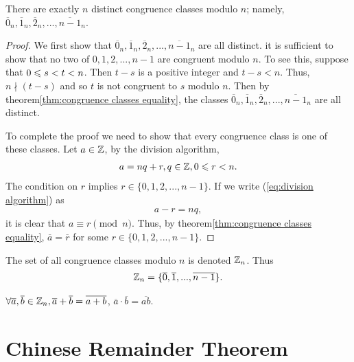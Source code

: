 \begin{corollary}{}{}
    There are exactly $n$ distinct congruence classes modulo $n$; namely, 
    $\overline{0}_n,\overline{1}_n,\overline{2}_n,...,\overline{n-1}_n$.
\end{corollary}
\begin{proof}
    We first show that $\overline{0}_n,\overline{1}_n,\overline{2}_n,...,\overline{n-1}_n$
    are all distinct. it is sufficient to show that  no two of $0, 1, 2, . . . , n-1$ are congruent modulo $n$. 
    To see this, suppose that $0\leqslant s<t<n$. 
    Then $t-s$ is a positive integer and $t-s<n$. Thus, $n\nmid (t-s)$ and so $t$ is not congruent to $s$ modulo $n$. 
    Then by theorem\ref{thm:congruence classes equality}, the classes
    $\overline{0}_n,\overline{1}_n,\overline{2}_n,...,\overline{n-1}_n$ are all distinct. 

    To complete the proof we need to show that every congruence class is one of these classes.
    Let $a\in\mathbb{Z}$, by the division algorithm, 
    \begin{align}
        a=nq+r, q\in\mathbb{Z},0\leqslant r<n.
        \label{eq:division algorithm}
    \end{align}
    The condition on $r$ implies $r\in\{0,1,2,...,n-1\}$. If we write (\ref{eq:division algorithm}) as
    \begin{align*}
        a -r=nq,
    \end{align*}
    it is clear that $a\equiv r\pmod n$. Thus, by theorem\ref{thm:congruence classes equality}, $\overline{a}=\overline{r}$ for some $r\in\{0,1,2,...,n-1\}$.
\end{proof}

\begin{definition}{}{}
    The set of all congruence classes modulo $n$ is denoted $\mathbb{Z}_n$. Thus
    \begin{align*}
        \mathbb{Z}_n=\{\overline{0},\overline{1},...,\overline{n-1}\}.
    \end{align*}
\end{definition}


\begin{proposition}{}{}
    $\forall \overline{a},\overline{b}\in \mathbb{Z}_n, \overline{a}+\overline{b}=\overline{a+b}$, $\overline{a}\cdot \overline{b} = \overline{ab}$.
\end{proposition}


\section{Chinese Remainder Theorem}

